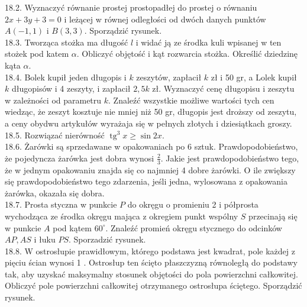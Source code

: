 \documentclass[10pt]{article}
\begin{document}
18.2. Wyznaczyć równanie prostej prostopadłej do prostej o równaniu $2 x+3 y+3=0$ i leżącej w równej odległości od dwóch danych punktów $A(-1,1)$ i $B(3,3)$. Sporządzić rysunek.\\
18.3. Tworząca stożka ma długość $l$ i widać ją ze środka kuli wpisanej w ten stożek pod katem $\alpha$. Obliczyć objętość i kąt rozwarcia stożka. Określić dziedzinę kąta $\alpha$.\\
18.4. Bolek kupił jeden długopis i $k$ zeszytów, zapłacił $k$ zł i 50 gr, a Lolek kupił $k$ długopisów i 4 zeszyty, i zapłacił $2,5 k$ zł. Wyznaczyć cenę długopisu i zeszytu w zależności od parametru $k$. Znaleźć wszystkie możliwe wartości tych cen wiedząc, że zeszyt kosztuje nie mniej niż 50 gr, długopis jest droższy od zeszytu, a ceny obydwu artykułów wyrażaja się w pełnych złotych i dziesiątkach groszy.\\
18.5. Rozwiązać nierówność $\operatorname{tg}^{3} x \geq \sin 2 x$.\\
18.6. Żarówki są sprzedawane w opakowaniach po 6 sztuk. Prawdopodobieństwo, że pojedyncza żarówka jest dobra wynosi $\frac{2}{3}$. Jakie jest prawdopodobieństwo tego, że w jednym opakowaniu znajda się co najmniej 4 dobre żarówki. O ile zwiększy się prawdopodobieństwo tego zdarzenia, jeśli jedna, wylosowana z opakowania żarówka, okazała się dobra.\\
18.7. Prosta styczna w punkcie $P$ do okręgu o promieniu 2 i półprosta wychodząca ze środka okręgu mająca z okregiem punkt wspólny $S$ przecinają się w punkcie $A$ pod kątem $60^{\circ}$. Znaleźć promień okręgu stycznego do odcinków $A P, A S$ i łuku $P S$. Sporzadzić rysunek.\\
18.8. W ostrosłupie prawidłowym, którego podstawa jest kwadrat, pole każdej z pięciu ścian wynosi 1 . Ostrosłup ten ścięto płaszczyzną równoległą do podstawy tak, aby uzyskać maksymalny stosunek objętości do pola powierzchni całkowitej. Obliczyć pole powierzchni całkowitej otrzymanego ostrosłupa ściętego. Sporządzić rysunek.
\end{document}
